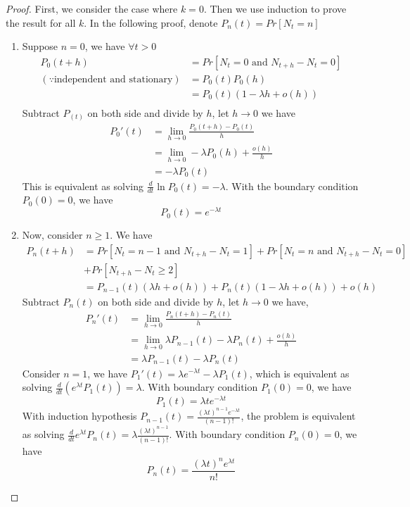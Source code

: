\documentclass[../Distributions.tex]{subfiles}
\begin{document}
\begin{proof}
	First, we consider the case where $k=0$. Then we use induction to prove the result for all $k$. In the following proof, denote $P_n(t) = Pr[N_t=n]$
	\begin{enumerate}
		\item Suppose $n=0$, we have $\forall t>0$
		\begin{align*}
		P_0(t+h) &= Pr[N_t=0\mbox{ and }N_{t+h}-N_t=0]\\
		(\because\mbox{independent and stationary})&= P_0(t)P_0(h)\\
		&=P_0(t)(1-\lambda h+o(h))\\
	\end{align*}
	Subtract $P_(t)$ on both side and divide by $h$, let $h\rightarrow0$ we have 
	\begin{align*}
		P_0'(t) &= \lim_{h\rightarrow0}\frac{P_0(t+h)-P_0(t)}{h}\\
		&=\lim_{h\rightarrow0}-\lambda P_0(h) + \frac{o(h)}{h}\\
		&=-\lambda P_0(t)
	\end{align*}
	This is equivalent as solving $\frac{d}{dt}\ln P_0(t) = -\lambda$. With the boundary condition $P_0(0)=0$, we have
	$$P_0(t) = e^{-\lambda t}$$
	\item Now, consider $n\geq1$. We have
	\begin{align*}
	P_n(t+h)&=Pr[N_t = n-1\mbox{ and }N_{t+h}-N_t=1] + Pr[N_t=n\mbox{ and }N_{t+h}-N_t=0]\\
	& + Pr[N_{t+h}-N_t\geq2]\\
	&=P_{n-1}(t)(\lambda h+o(h)) + P_n(t)(1-\lambda h+o(h)) + o(h)
	\end{align*}
	Subtract $P_n(t)$ on both side and divide by $h$, let $h\rightarrow0$ we have,
	\begin{align*}
	P_n'(t) &= \lim_{h\rightarrow0}\frac{P_n(t+h)-P_n(t)}{h}\\
	&=\lim_{h\rightarrow0}\lambda P_{n-1}(t)-\lambda P_n(t) + \frac{o(h)}{h}\\
	&=\lambda P_{n-1}(t)-\lambda P_n(t)
	\end{align*}
	Consider $n=1$, we have $P_1'(t) = \lambda e^{-\lambda t} - \lambda P_1(t)$, which is equivalent as solving $\frac{d}{dt}(e^{\lambda t}P_1(t)) = \lambda$. With boundary condition $P_1(0)=0$, we have
	$$P_1(t) = \lambda te^{-\lambda t}$$
	With induction hypothesis $P_{n-1}(t) = \frac{(\lambda t)^{n-1}e^{-\lambda t}}{(n-1)!}$, the problem is  equivalent as solving $\frac{d}{dt}e^{\lambda t}P_n(t) = \lambda\frac{(\lambda t)^{n-1}}{(n-1)!}$. With boundary condition $P_n(0)=0$, we have
	$$P_n(t) = \frac{(\lambda t)^ne^{\lambda t}}{n!}$$
	\end{enumerate}
\end{proof}
\end{document}

